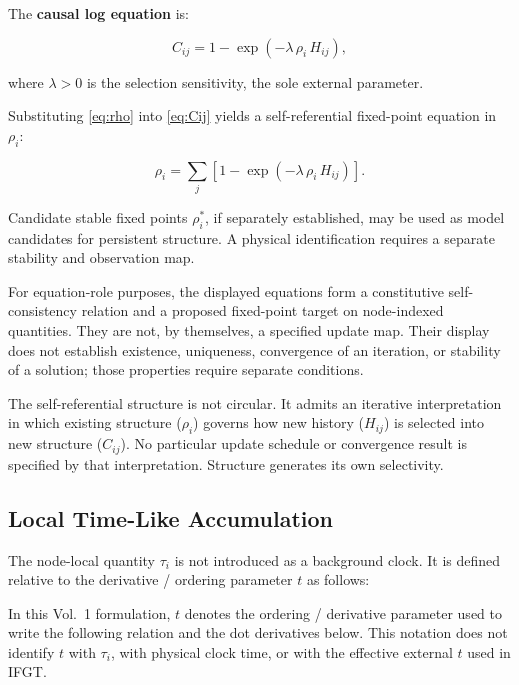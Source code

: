 The \textbf{causal log equation} is:

\begin{keybox}
\begin{equation}
  C_{ij} = 1 - \exp(-\lambda\,\rho_i\,H_{ij}),
  \label{eq:Cij}
\end{equation}
\end{keybox}

\noindent
where $\lambda > 0$ is the selection sensitivity, the sole external parameter.

Substituting \cref{eq:rho} into \cref{eq:Cij} yields a self-referential
fixed-point equation in $\rho_i$:

\[
  \rho_i = \sum_j \left[1 - \exp(-\lambda\,\rho_i\,H_{ij})\right].
\]

Candidate stable fixed points $\rho_i^*$, if separately established, may be
used as model candidates for persistent structure.  A physical identification
requires a separate stability and observation map.

For equation-role purposes, the displayed equations form a constitutive
self-consistency relation and a proposed fixed-point target on node-indexed
quantities. They are not, by themselves, a specified update map. Their display
does not establish existence, uniqueness, convergence of an iteration, or
stability of a solution; those properties require separate conditions.

\begin{remark}
The self-referential structure is not circular.
It admits an iterative interpretation in which existing structure ($\rho_i$)
governs how new history ($H_{ij}$) is selected into new structure ($C_{ij}$).
No particular update schedule or convergence result is specified by that
interpretation.
Structure generates its own selectivity.
\end{remark}

\subsection{Local Time-Like Accumulation}

The node-local quantity $\tau_i$ is not introduced as a background clock. It is
defined relative to the derivative / ordering parameter $t$ as follows:

\begin{remark}
In this Vol.~1 formulation, $t$ denotes the ordering / derivative parameter
used to write the following relation and the dot derivatives below. This
notation does not identify $t$ with $\tau_i$, with physical clock time, or
with the effective external $t$ used in IFGT.
\end{remark}

